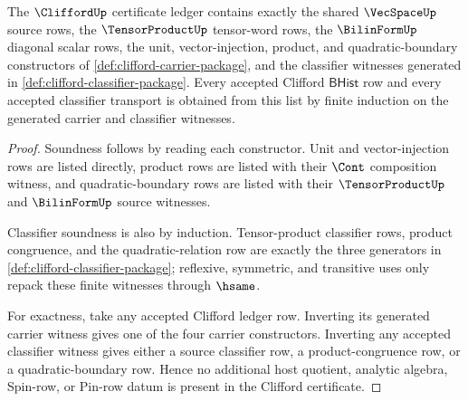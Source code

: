 \begin{theorem}
\label{thm:clifford-ledger-exactness-obligation}
The $\CliffordUp$ certificate ledger contains exactly the shared $\VecSpaceUp$ source rows, the $\TensorProductUp$ tensor-word rows, the $\BilinFormUp$ diagonal scalar rows, the unit, vector-injection, product, and quadratic-boundary constructors of \autoref{def:clifford-carrier-package}, and the classifier witnesses generated in \autoref{def:clifford-classifier-package}. Every accepted Clifford $\mathsf{BHist}$ row and every accepted classifier transport is obtained from this list by finite induction on the generated carrier and classifier witnesses.
\end{theorem}
\begin{proof}
Soundness follows by reading each constructor. Unit and vector-injection rows are listed directly, product rows are listed with their $\Cont$ composition witness, and quadratic-boundary rows are listed with their $\TensorProductUp$ and $\BilinFormUp$ source witnesses.

Classifier soundness is also by induction. Tensor-product classifier rows, product congruence, and the quadratic-relation row are exactly the three generators in \autoref{def:clifford-classifier-package}; reflexive, symmetric, and transitive uses only repack these finite witnesses through $\hsame$.

For exactness, take any accepted Clifford ledger row. Inverting its generated carrier witness gives one of the four carrier constructors. Inverting any accepted classifier witness gives either a source classifier row, a product-congruence row, or a quadratic-boundary row. Hence no additional host quotient, analytic algebra, Spin-row, or Pin-row datum is present in the Clifford certificate.
\end{proof}

